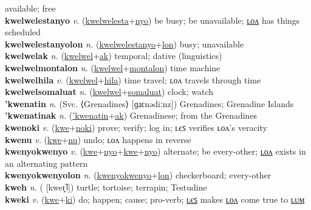 available; free \label{kwelwelestalon} \\
\textbf{kwelwelestanyo} \textit{v.} (\hyperref[kwelwelesta]{kwelwelesta}+\hyperref[nyo]{nyo})
be busy; be unavailable; \hyperref[kwelwelestanyolon]{ʟᴏᴧ} has things scheduled \label{kwelwelestanyo} \\
\textbf{kwelwelestanyolon} \textit{n.} (\hyperref[kwelwelestanyo]{kwelwelestanyo}+\hyperref[lon]{lon})
busy; unavailable \label{kwelwelestanyolon} \\
\textbf{kwelwelak} \textit{n.} (\hyperref[kwelwel]{kwelwel}+\hyperref[ak]{ak})
temporal; dative (linguistics) \label{kwelwelak} \\
\textbf{kwelwelmontalon} \textit{n.} (\hyperref[kwelwel]{kwelwel}+\hyperref[montalon]{montalon})
time machine \label{kwelwelmontalon} \\
\textbf{kwelwelhila} \textit{v.} (\hyperref[kwelwel]{kwelwel}+\hyperref[hila]{hila})
time travel; ʟᴏᴧ travels through time \label{kwelwelhila} \\
\textbf{kwelwelsomaluat} \textit{n.} (\hyperref[kwelwel]{kwelwel}+\hyperref[somaluat]{somaluat})
clock; watch \label{kwelwelsomaluat} \\
\textbf{'kwenatin} \textit{n.} (Svc. ⟨Grenadines⟩ [ɡɹɛnədiːnz])
Grenadines; Grenadine Islands \label{'kwenatin} \\
\textbf{'kwenatinak} \textit{n.} (\hyperref['kwenatin]{'kwenatin}+\hyperref[ak]{ak})
Grenadinese; from the Grenadines \label{'kwenatinak} \\
\textbf{kwenoki} \textit{v.} (\hyperref[kwe]{kwe}+\hyperref[noki]{noki})
prove; verify; log in; ʟєꜱ verifies ʟᴏᴧ’s veracity \label{kwenoki} \\
\textbf{kwenu} \textit{v.} (\hyperref[kwe]{kwe}+\hyperref[nu]{nu})
undo; ʟᴏᴧ happens in reverse \label{kwenu} \\
\textbf{kwenyokwenyo} \textit{v.} (\hyperref[kwe]{kwe}+\hyperref[nyo]{nyo}+\hyperref[kwe]{kwe}+\hyperref[nyo]{nyo})
alternate; be every-other; \hyperref[kwenyokwenyolon]{ʟᴏᴧ} exists in an alternating pattern \label{kwenyokwenyo} \\
\textbf{kwenyokwenyolon} \textit{n.} (\hyperref[kwenyokwenyo]{kwenyokwenyo}+\hyperref[lon]{lon})
checkerboard; every-other \label{kwenyokwenyolon} \\
\textbf{kweh} \textit{n.} ( [kweɪ̯˥])
turtle; tortoise; terrapin; Testudine \label{kweh} \\
\textbf{kweki} \textit{v.} (\hyperref[kwe]{kwe}+\hyperref[ki]{ki})
do; happen; cause; pro-verb; \hyperref[kwekiles]{ʟєꜱ} makes \hyperref[kwekilon]{ʟᴏᴧ} come true to \hyperref[kwekilum]{ʟᴜᴍ} \label{kweki} \\
